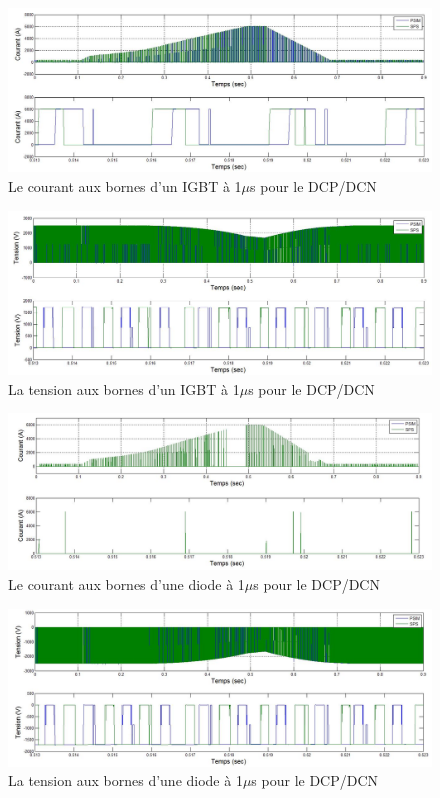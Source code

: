 \documentclass[11pt,letterpaper,final]{report}
\begin{document}
\begin{figure}[htb]
\centering
\includegraphics[scale=0.5]{Fig/DCP_AFE/1u/hash_cou_IGBT.jpg}
\caption{Le courant aux bornes d'un IGBT à 1$\mu$s pour le DCP/DCN}
\label{AF_DC_HAA1}
\end{figure}



\begin{figure}[htb]
\centering
\includegraphics[scale=0.5]{Fig/DCP_AFE/1u/hash_ten_IGBT.jpg}
\caption{La tension aux bornes d'un IGBT à 1$\mu$s pour le DCP/DCN}
\label{AF_DC_HAV1}
\end{figure}



\begin{figure}[htb]
\centering
\includegraphics[scale=0.5]{Fig/DCP_AFE/1u/hash_diode_cou.jpg}
\caption{Le courant aux bornes d'une diode à 1$\mu$s pour le DCP/DCN}
\label{AF_DC_HA1}
\end{figure}


\begin{figure}[htb]
\centering
\includegraphics[scale=0.5]{Fig/DCP_AFE/1u/hash_diode.jpg}
\caption{La tension aux bornes d'une diode à 1$\mu$s pour le DCP/DCN}
\label{AF_DC_HV1}
\end{figure}
\end{document}

